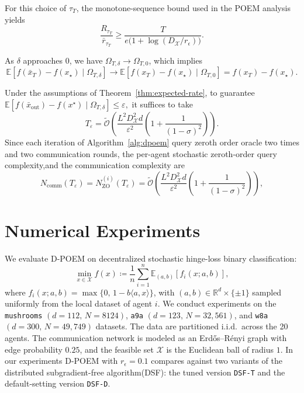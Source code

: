 \documentclass[runningheads]{llncs}
\begin{document}
For this choice of \(\tau_T\), the monotone-sequence bound used in the POEM
analysis yields
\[
\frac{R_{\tau_T}}{\bar r_{\tau_T}}
\ge
\frac{T}{e\bigl(1+\log(D_{\mathcal{X}}/r_\epsilon)\bigr)}.
\]
\begin{remark}
As $\delta$ approaches $0$, we have $\Omega_{T,\delta} \to \Omega_{T,0}$, which implies
\[
\mathbb{E}\!\left[f(\bar{x}_T)-f(x_\star)\mid \Omega_{T,\delta}\right]
\to
\mathbb{E}\!\left[f(x_T)-f(x_\star)\mid \Omega_{T,0}\right]
=
f(x_T)-f(x_\star).
\]
\end{remark}
\begin{corollary}\label{cor:expected-complexity}
Under the assumptions of Theorem~\ref{thm:expected-rate}, to guarantee
\(
\mathbb E\!\left[f(\bar x_{\mathrm{out}})-f(x^\star)\mid \Omega_{T,\delta}\right]
\le \varepsilon,
\)
it suffices to take
\begin{equation}
\label{eq:T-eps-comm}
T_\varepsilon
=
\widetilde{\mathcal O}\!\left(
\frac{L^2 D_{\mathcal{X}}^2 d}{\varepsilon^2}
\left(
1+\frac{1}{(1-\sigma)^2}
\right)
\right).
\end{equation}
Since each iteration of Algorithm~\ref{alg:dpoem} query zeroth order oracle two times and two communication rounds, the per-agent stochastic zeroth-order query
complexity,and the communication complexity are
\[
N_{\mathrm{comm}}(T_\varepsilon)=N_{\mathrm{ZO}}^{(i)}(T_\varepsilon)
=
\widetilde{\mathcal O}\!\left(
\frac{L^2 D_{\mathcal{X}}^2 d}{\varepsilon^2}
\left(
1+\frac{1}{(1-\sigma)^2}
\right)
\right),
\nonumber
\label{eq:complexity-agent}
\]
\end{corollary}

\section{Numerical Experiments}
We evaluate D-POEM on decentralized stochastic hinge-loss binary classification:
\[
\min_{x\in\mathcal{X}} f(x)\coloneq \frac{1}{n}\sum_{i=1}^{n}\mathbb{E}_{(a,b)}\!\left[f_i(x;a,b)\right],
\]
where $f_i(x;a,b)=\max\{0,\,1-b\langle a,x\rangle\}$, with \((a,b)\in\mathbb{R}^d\times\{\pm1\}\) 
sampled uniformly from the local  dataset of agent \(i\). We conduct experiments 
on the \texttt{mushrooms} \((d=112,\, N=8124)\), \texttt{a9a} \((d=123,\, N=32{,}561)\), 
and \texttt{w8a} \((d=300,\, N=49{,}749)\) datasets. The data are partitioned i.i.d.\ across the 20 agents. The communication network 
is modeled as an Erd\H{o}s--R\'enyi graph with edge probability \(0.25\), 
and the feasible set \(\mathcal{X}\) is the Euclidean ball of radius \(1\).
In our experiments D-POEM  with $r_{\epsilon} = 0.1$ compares against two variants of the distributed subgradient-free algorithm(DSF)\cite{wang2019distributed}: 
the tuned version \texttt{DSF-T} and the default-setting version \texttt{DSF-D}.
\end{document}
